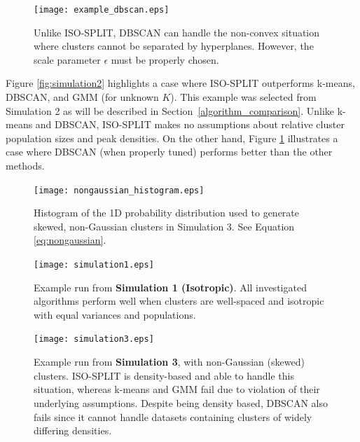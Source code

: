 \documentclass[10pt]{article}
\begin{document}
\begin{figure}
\begin{center}
\texttt{[image: example\_dbscan.eps]}
\end{center}
\caption{
Unlike ISO-SPLIT, DBSCAN can handle the non-convex situation where clusters cannot be separated by hyperplanes. However, the scale parameter $\epsilon$ must be properly chosen.
}
\label{fig:example_dbscan}
\end{figure}

Figure \ref{fig:simulation2} highlights a case where ISO-SPLIT outperforms k-means, DBSCAN, and GMM (for unknown $K$). This example was selected from Simulation 2 as will be described in Section~\ref{algorithm_comparison}. Unlike k-means and DBSCAN, ISO-SPLIT makes no assumptions about relative cluster population sizes and peak densities. On the other hand, Figure \ref{fig:example_dbscan} illustrates a case where DBSCAN (when properly tuned) performs better than the other methods.

\begin{figure}
\begin{center}
\texttt{[image: nongaussian\_histogram.eps]}
\end{center}
\caption{
Histogram of the 1D probability distribution used to generate skewed, non-Gaussian clusters in Simulation 3. See Equation \eqref{eq:nongaussian}.
}
\label{fig:nongaussian_histogram}
\end{figure}

\begin{figure}
\begin{center}
\texttt{[image: simulation1.eps]}
\end{center}
\caption{
Example run from \textbf{Simulation 1 (Isotropic)}. All investigated algorithms perform well when clusters are well-spaced and isotropic with equal variances and populations.
}
\label{fig:simulation1}
\end{figure}

\begin{figure}
\begin{center}
\texttt{[image: simulation3.eps]}
\end{center}
\caption{
Example run from \textbf{Simulation 3}, with non-Gaussian (skewed) clusters. ISO-SPLIT is density-based and able to handle this situation, whereas k-means and GMM fail due to violation of their underlying assumptions. Despite being density based, DBSCAN also fails since it cannot handle datasets containing clusters of widely differing densities.
}
\label{fig:simulation3}
\end{figure}
\end{document}
